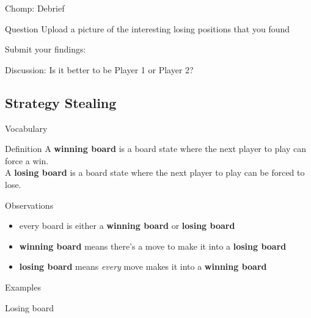 \documentclass{beamer}
\begin{document}
\begin{frame}{Chomp: Debrief}
\pause
  \begin{block}{Question}
    Upload a picture of the interesting losing positions that you found
  \end{block}
\pause
  \begin{block}{Submit your findings:}
    \begin{center}
    \end{center}
  \end{block}
\pause
  \begin{block}{Discussion:}
    Is it better to be {\color{blue}Player 1} or {\color{red}Player 2}?
  \end{block}
\end{frame}

\subsection{Strategy Stealing}

\begin{frame}{Vocabulary}
\pause
  \begin{block}{Definition}
\pause
    A \textbf{winning board} is a board state where the next player to play can force a win.\\
\pause
    A \textbf{losing board} is a board state where the next player to play can be forced to lose.
  \end{block}
\pause
  \begin{block}{Observations}
    \begin{itemize}
\pause
      \item every board is either a \textbf{winning board} or \textbf{losing board}
\pause
      \item \textbf{winning board} means there's a move to make it into a \textbf{losing board}
\pause
      \item \textbf{losing board} means \emph{every} move makes it into a \textbf{winning board}
    \end{itemize}
  \end{block}
  
\end{frame}

\begin{frame}{Examples}
  \begin{block}{Losing board}
    \begin{center}
    \end{center}
  \end{block}
\end{frame}
\end{document}
